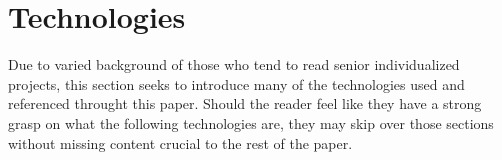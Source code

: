 \section{Technologies}
Due to varied background of those who tend to read senior individualized projects, this section seeks to introduce many of the technologies used and referenced throught this paper.  Should the reader feel like they have a strong grasp on what the following technologies are, they may skip over those sections without missing content crucial to the rest of the paper.



